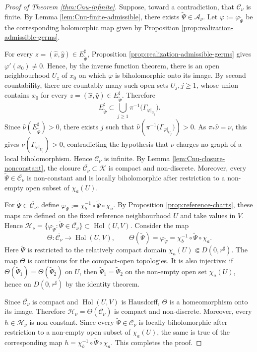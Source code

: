 \documentclass[11pt]{amsart}
\numberwithin{equation}{section}
\theoremstyle{plain}
\theoremstyle{definition}
\theoremstyle{remark}
\begin{document}
\begin{proof}[Proof of Theorem \ref{thm:Cnu-infinite}]
Suppose, toward a contradiction, that $\mathcal C_\nu$ is finite.
By Lemma \ref{lem:Cnu-finite-admissible}, there exists
$\widetilde\Psi\in\mathcal A_\nu$. Let
$\varphi:=\varphi_{\widetilde\Psi}$ be the corresponding holomorphic
map given by Proposition
\ref{prop:realization-admissible-germs}.

For every
$z=(\hat x,\hat y)\in E^\sharp_{\widetilde\Psi}$,
Proposition \ref{prop:realization-admissible-germs} gives
$\varphi'(x_0)\neq0$. Hence, by the inverse function theorem, there
is an open neighbourhood $U_z$ of $x_0$ on which $\varphi$ is
biholomorphic onto its image. By second countability, there are
countably many such open sets $U_j, j\geq 1$,
whose union contains $x_0$ for every
$z=(\hat x,\hat y)\in E^\sharp_{\widetilde\Psi}$. Therefore
$$
E^\sharp_{\widetilde\Psi}
\subset
\bigcup_{j\geq1}
\pi^{-1}\bigl(\Gamma_{\varphi|_{U_j}}\bigr).
$$
Since
$\hat\nu(E^\sharp_{\widetilde\Psi})>0$, there exists $j$ such that
$
\hat\nu\!\left(
\pi^{-1}\bigl(\Gamma_{\varphi|_{U_j}}\bigr)
\right)>0.
$
As $\pi_*\hat\nu=\nu$, this gives
$\nu(\Gamma_{\varphi|_{U_j}})>0$, contradicting the hypothesis that
$\nu$ charges no graph of a local biholomorphism. Hence
$\mathcal C_\nu$ is infinite.
By Lemma
\ref{lem:Cnu-closure-nonconstant}, the closure
$\overline{\mathcal C_\nu}
\subset\mathcal K$
is compact and non-discrete. Moreover, every
$\widetilde\Psi\in\overline{\mathcal C_\nu}$
is non-constant and is
locally biholomorphic after restriction to a non-empty open subset 
of $\chi_a(U)$.

For
$\widetilde\Psi\in\overline{\mathcal C_\nu}$, 
define
$
\varphi_{\widetilde\Psi}
:= \chi_b^{-1}
\circ\widetilde\Psi\circ
\chi_a$.
By Proposition \ref{prop:reference-charts}, these maps are defined on
the fixed reference neighbourhood $U$ and take values in $V$.
Hence 
$\mathscr H_\nu=
\{
\varphi_{\widetilde\Psi}:
\widetilde\Psi\in\overline{\mathcal C_\nu}
\}
\subset\operatorname{Hol}(U,V)$. Consider
the map
$$
\Theta\colon
\overline{\mathcal C_\nu}
\to
\operatorname{Hol}(U,V),
\qquad
\Theta(\widetilde\Psi)
= \varphi_{\widetilde \Psi}
=
\chi_b^{-1}
\circ\widetilde\Psi\circ
\chi_a.
$$
Here $\widetilde\Psi$ is restricted to the relatively compact domain
$\chi_a(U)\Subset D(0,r^\sharp)$. The map $\Theta$ is continuous for
the compact-open topologies. It is also injective: if
$\Theta(\widetilde\Psi_1)=\Theta(\widetilde\Psi_2)$ on $U$, then
$\widetilde\Psi_1=\widetilde\Psi_2$ on the non-empty open set
$\chi_a
(U)$, hence on $D(0,r^\sharp)$ by the identity theorem.

Since $\overline{\mathcal C_\nu}$ is compact and
$\operatorname{Hol}(U,V)$ is Hausdorff, $\Theta$ is a homeomorphism
onto its image. Therefore
$
\mathscr H_\nu=\Theta(\overline{\mathcal C_\nu})
$
is compact and non-discrete.
Moreover, every $h\in\mathscr H_\nu$ is non-constant. Since every
$\widetilde\Psi \in \overline{\mathcal C_\nu}$ is locally biholomorphic
after restriction to a non-empty open subset of
$\chi_a(U)$,
the same is true of the
corresponding map
$h=
\chi_b^{-1}
\circ\widetilde\Psi\circ
\chi_a$.
This completes the proof.
\end{proof}
\end{document}
